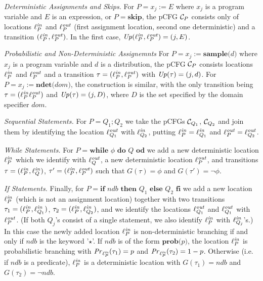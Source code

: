 \begin{compactenum}
\item {\em Deterministic Assignments and Skips.}
For $P= {x_j}{:=}{E}$ where $x_j$ is a program variable and $E$ is an 
expression, or $P = \textbf{skip}$, the pCFG $\mathcal{C}_P$ consists only of
locations $\ell^{\mathit{in}}_P$ and $\ell^{\mathit{out}}_P$ (first assignment location, 
second one deterministic) and a
transition $(\ell^{\mathit{in}}_{P},\ell^{\mathit{out}}_P)$. In the first case, 
$\mathit{Up}(\ell^{\mathit{in}}_{P},\ell^{\mathit{out}}_P)=(j,E)$.
\item {\em Probabilistic and Non-Deterministic Assignemnts}
For $P= {x_j}{:=}{\textbf{sample($d$)}}$ where $x_j$ is a program variable and 
$d$ is a distribution, the pCFG $\mathcal{C}_P$ consists locations $\ell^{\mathit{in}}_P$ 
and $\ell^{\mathit{out}}_P$ and a
transition $\tau=(\ell^{\mathit{in}}_{P},\ell^{\mathit{out}}_P)$ with $\mathit{Up}(\tau)=(j,d)$. For 
$P= 
{x_j}{:=}{\textbf{ndet($\mathit{dom}$)}}$, the construction is similar, with 
the only transition being $\tau=(\ell^{\mathit{in}}_{P}\ell^{\mathit{out}}_P)$ and 
$\mathit{Up}(\tau)=(j,D)$, where 
$D$ is 
the set specified by the domain specifier $\mathit{dom}$.

\item {\em Sequential Statements.}
For $P = Q_1;Q_2$ we take the pCFGs $\mathcal{C}_{Q_1}$, $\mathcal{C}_{Q_2}$ and
join them by identifying the location $\ell^{\mathit{out}}_{Q_1}$ with
$\ell^{\mathit{in}}_{Q_2}$, putting $\ell^{\mathit{in}}_{P}=\ell^{\mathit{in}}_{Q_1}$ and
$\ell^{\mathit{out}}_{P}=\ell^{\mathit{out}}_{Q_2}$.

\item {\em While Statements.}
For $P = \textbf{while $\phi$ do }Q \textbf{ od}$ we add a new deterministic
location $\ell^{\mathit{in}}_{P}$ which we identify with $\ell^{\mathit{out}}_{Q}$, a new
deterministic location $\ell^{\mathit{out}}_{P}$, and transitions
$\tau=(\ell^{\mathit{in}}_{P},\ell^{\mathit{in}}_{Q})$,
$\tau'=(\ell^{\mathit{in}}_{P},\ell^{\mathit{out}}_{P})$ such that $G(\tau)=\phi$ and
$G(\tau')=\neg\phi$.

\item {\em If Statements.}
Finally, for $P = \textbf{if $\mathit{ndb}$ then }Q_1 \textbf{ else } Q_2
\textbf{ fi}$ we add a new location $\ell^{\mathit{in}}_{P}$ (which is not an 
assignment location) together with two
transitions $\tau_1 = (\ell^{\mathit{in}}_{P},\ell^{\mathit{in}}_{Q_1})$, $\tau_2 =
(\ell^{\mathit{in}}_{P},\ell^{\mathit{in}}_{Q_2})$, and we identify the locations 
$\ell^{\mathit{out}}_{Q_1}$ and $\ell^{\mathit{out}}_{Q_1}$ with $\ell^{\mathit{out}}_{P}$. (If both
$Q_j$'s consist of a single statement, we also identify $\ell^{\mathit{in}}_{P}$ with 
$\ell^{\mathit{in}}_{Q_j}$'s.) In this
case the newly added location $\ell^{\mathit{in}}_{P}$ is non-deterministic branching if 
and only 
if
$ndb$ is the keyword '$\star$'. If
$\mathit{ndb}$ is of the form $\textbf{prob($p$)}$, the location $\ell^{\mathit{in}}_{P}$
is probabilistic branching with $\mathit{Pr}_{\ell^{\mathit{in}}_{P}}(\tau_1)=p$ and
$\mathit{Pr}_{\ell^{\mathit{in}}_{P}}(\tau_2)=1-p$. Otherwise (i.e. if $\mathit{ndb}$ is a
predicate), $\ell^{\mathit{in}}_{P}$ is a deterministic location
with $G(\tau_1)=\mathit{ndb}$ and $G(\tau_2)=\neg \mathit{ndb}$.
\end{compactenum}
